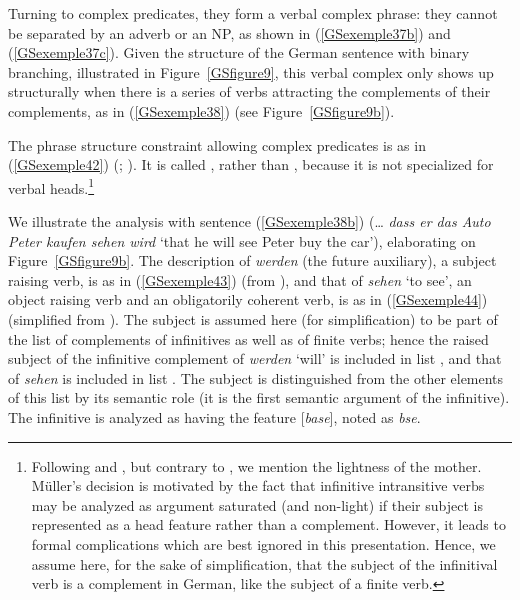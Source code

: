 {%

Turning to complex predicates, they form a verbal complex phrase: they cannot be separated by an adverb or an NP, as shown in (\ref{GSexemple37b}) and (\ref{GSexemple37c}). Given the structure of the German sentence with binary branching, illustrated in Figure~\ref{GSfigure9}, this verbal complex only shows up structurally when there is a series of verbs attracting the complements of their complements, as in (\ref{GSexemple38}) (see Figure~\ref{GSfigure9b}).

The phrase structure constraint allowing complex predicates is as in (\ref{GSexemple42}) (\citealt{MuellerCopula}; \citealt[39]{muller2018clause}). It is called , rather than , because it is not specialized for verbal heads.\footnote{Following \cite{HN94a} and \cite{dKM2001a}, but contrary to \cite{muller2018clause}, we mention the lightness of the mother. Müller’s decision is motivated by the fact that infinitive intransitive verbs may be analyzed as argument saturated (and non-light) if their subject is represented as a head feature rather than a complement. However, it leads to formal complications which are best ignored in this presentation. Hence, we assume here, for the sake of simplification, that the subject of the infinitival verb is a complement in German, like the subject of a finite verb.  }  

\begin{exe}
\end{exe}

We illustrate the analysis with sentence (\ref{GSexemple38b}) (\ldots{} \emph{dass er das Auto Peter kaufen sehen wird} `that he will see Peter buy the car’), elaborating on Figure~\ref{GSfigure9b}. The description of \emph{werden} (the future auxiliary), a subject raising verb, is as in (\ref{GSexemple43}) (from \citealt[39]{muller2018clause}), and that of \emph{sehen} `to see', an object raising verb and an obligatorily coherent verb, is as in (\ref{GSexemple44}) (simplified from \citealt[102]{Mueller2002b}). The subject is assumed here (for simplification) to be part of the list of complements of infinitives as well as of finite verbs; hence the raised subject of the infinitive complement of \emph{werden} `will' is included in list , and that of \emph{sehen} is included in list . The subject is distinguished from the other elements of this list by its semantic role (it is the first semantic argument of the infinitive).
The infinitive is analyzed as having the feature [\vform \textit{base}], noted as \textit{bse}.

}
